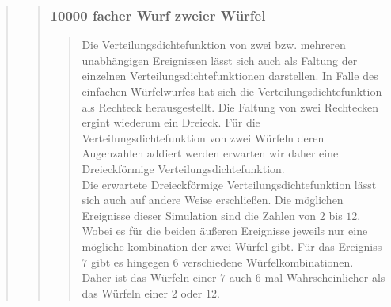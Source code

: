 \begin{quote}
\begin{quote}
        \subsubsection{10000 facher Wurf zweier Würfel}
        \begin{quote}
            Die Verteilungsdichtefunktion von zwei bzw. mehreren unabhängigen Ereignissen lässt sich auch als Faltung
            der einzelnen Verteilungsdichtefunktionen darstellen. In Falle des einfachen Würfelwurfes hat sich die
            Verteilungsdichtefunktion als Rechteck herausgestellt. Die Faltung von zwei Rechtecken ergint wiederum ein
            Dreieck. Für die Verteilungsdichtefunktion von zwei Würfeln deren Augenzahlen addiert werden erwarten wir
            daher eine Dreieckförmige Verteilungsdichtefunktion.\\
            Die erwartete Dreieckförmige Verteilungsdichtefunktion lässt sich auch auf andere Weise erschließen. Die
            möglichen Ereignisse dieser Simulation sind die Zahlen von $2$ bis $12$. Wobei es für die beiden äußeren
            Ereignisse jeweils nur eine mögliche kombination der zwei Würfel gibt. Für das Ereigniss $7$ gibt es
            hingegen $6$ verschiedene Würfelkombinationen. Daher ist das Würfeln einer $7$ auch $6$ mal Wahrscheinlicher
            als das Würfeln einer $2$ oder $12$.\\
            

\end{quote}
\end{quote}
\end{quote}
